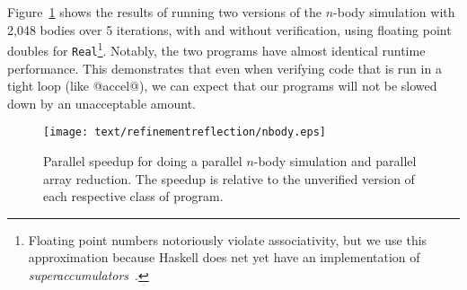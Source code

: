 Figure~\ref{fig:nbody} shows the results of running two versions of the $n$-body
simulation with 2,048 bodies over 5 iterations, with and without verification,
using floating point doubles for \texttt{Real}\footnote{Floating point numbers
  notoriously violate associativity, but we use this approximation because
  Haskell does net yet have an implementation of {\em
    superaccumulators}~\cite{superaccumulation}.}. Notably, the two programs have almost
identical runtime performance.  This demonstrates that even when verifying code
that is run in a tight loop (like @accel@), we can expect that our programs
will not be slowed down by an unacceptable amount.

\begin{figure}
\captionsetup{justification=centering}
  \begin{center}
    \texttt{[image: text/refinementreflection/nbody.eps]}
  \end{center}
  \caption[Parallel speedup for $n$-body simulation and array reduction.]
      {Parallel speedup for doing a parallel $n$-body simulation and
      parallel array reduction. The speedup is relative to the
    unverified version of each respective class of program.}
  \label{fig:nbody}
\end{figure}

